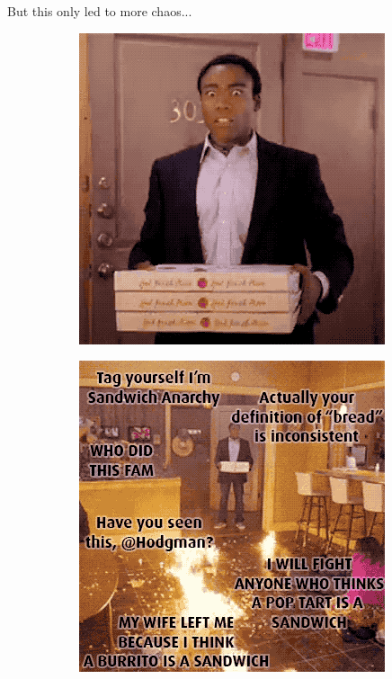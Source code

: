 \documentclass{beamer}
\begin{document}
\begin{frame}{But this only led to more chaos...}
    \begin{figure}
        \begin{subfigure}{.5\textwidth}
          \centering
          \includegraphics[width=.8\linewidth]{sandwich_chaos/slice_6.png} %
          \label{fig:sandwich-chaos-left}
        \end{subfigure}%
        \begin{subfigure}{.5\textwidth}
          \centering
          \includegraphics[width=.8\linewidth]{sandwich_chaos/slice_10.png}
          \label{fig:sandwich-chaos-right}
        \end{subfigure}
    \end{figure}
\end{frame}
\end{document}
